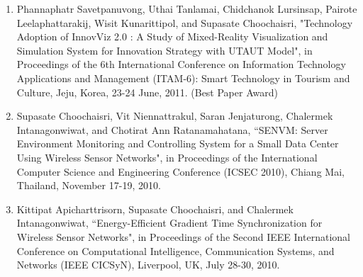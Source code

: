 \begin{enumerate}
\item Phannaphatr Savetpanuvong, Uthai Tanlamai, Chidchanok Lursinsap, Pairote Leelaphattarakij, Wisit Kunarittipol, and Supasate Choochaisri, "Technology Adoption of InnovViz 2.0 : A Study of Mixed-Reality Visualization and Simulation System for Innovation Strategy with UTAUT Model", in Proceedings of the 6th International Conference on Information Technology Applications and Management (ITAM-6): Smart Technology in Tourism and Culture, Jeju, Korea, 23-24 June, 2011. (Best Paper Award)
\item Supasate Choochaisri, Vit Niennattrakul, Saran Jenjaturong, Chalermek Intanagonwiwat, and Chotirat Ann Ratanamahatana, ``SENVM: Server Environment Monitoring and Controlling System for a Small Data Center Using Wireless Sensor Networks", in Proceedings of the International Computer Science and Engineering Conference (ICSEC 2010), Chiang Mai, Thailand, November 17-19, 2010.
\item  Kittipat Apicharttrisorn, Supasate Choochaisri, and Chalermek Intanagonwiwat, ``Energy-Efficient Gradient Time Synchronization for Wireless Sensor Networks", in Proceedings of the Second IEEE International Conference on Computational Intelligence, Communication Systems, and Networks (IEEE CICSyN), Liverpool, UK, July 28-30, 2010.
\end{enumerate}
